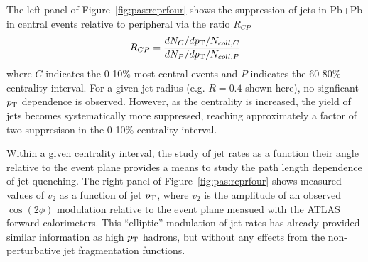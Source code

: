 The left panel of Figure~\ref{fig:pas:rcprfour} shows the suppression of jets in Pb+Pb
in central events relative to peripheral via the ratio $R_{CP}$
\begin{equation}
R_{CP} = \frac{dN_{C}/d\mbox{$p_{\mathrm{T}}$} / N_{coll,C}} {dN_{P}/d\mbox{$p_{\mathrm{T}}$} / N_{coll,P}}
\end{equation}
where $C$ indicates the 0-10\% most central events and $P$ indicates the 60-80\% centrality interval.
For a given jet radius (e.g. $R=0.4$ shown here), no signficant $\mbox{$p_{\mathrm{T}}$}$ dependence is observed.
However, as the centrality is increased, the yield of jets becomes systematically more suppressed,
reaching approximately a factor of two suppresison in the 0-10\% centrality interval.

Within a given centrality interval, the study of jet rates as a function their angle relative 
to the event plane provides a means to study the path length dependence of jet quenching.
The right panel of Figure~\ref{fig:pas:rcprfour} shows measured values of $v_2$ as a function
of jet $\mbox{$p_{\mathrm{T}}$}$, where $v_2$ is the amplitude of an observed $\cos(2\phi)$ modulation relative to
the event plane measued with the ATLAS forward calorimeters.  This ``elliptic'' modulation of
jet rates has already provided similar information as high $\mbox{$p_{\mathrm{T}}$}$ hadrons, but without 
any effects from the non-perturbative jet fragmentation functions.

